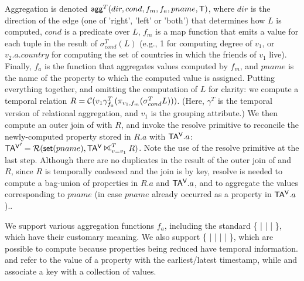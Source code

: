 Aggregation is denoted $\textsf{agg}^T(dir,cond,f_m,f_a,pname,\mathsf{T})$,
where $dir$ is the direction of the edge (one of 'right', 'left' or
'both') that determines how $L$ is computed, $cond$ is a predicate
over $L$, $f_m$ is a map function that emits a value for each tuple in
the result of $\sigma^T_{cond}(L)$ (e.g., 1 for computing degree of
$v_1$, or $v_2.a.country$ for computing the set of countries in which
the friends of $v_1$ live).  Finally, $f_a$ is the function that
aggregates values computed by $f_m$, and $pname$ is the name of the
property to which the computed value is assigned.  Putting everything
together, and omitting the computation of $L$ for clarity: we compute
a temporal relation $R = \mathcal{C}(v_1 \gamma^T_{f_a} (\pi_{v_1,f_m}
  (\sigma^T_{cond} L)))$. (Here, $\gamma^T$ is the temporal version of
relational aggregation, and $v_1$ is the grouping attribute.)  We then
compute an outer join of \tav with $R$, and invoke the resolve
primitive to reconcile the newly-computed property stored in $R.a$
with $\mathsf{TA^{V}}.a$: $\tav' = \resolve{\insql{set}(pname)}{\tav
  \rightouterjoin^T_{v=v_1} R}$. Note the use of the resolve primitive
at the last step.  Although there are no duplicates in the result of
the outer join of \tav and $R$, since $R$ is temporally coalesced and
the join is by key, resolve is needed to compute a bag-union of
properties in $R.a$ and $\mathsf{TA^{V}}.a$, and to aggregate the values
corresponding to $pname$ (in case $pname$ already occurred as a
property in $\mathsf{TA^{V}}.a$)..


We support various aggregation functions $f_a$, including the standard
\{  |  |  |  \}, which
have their customary meaning.  We also support \{  |
 |  |  |  \}, which
are possible to compute because properties being reduced have temporal
information.   and  refer to the value of a
property with the earliest/latest timestamp, while  and
 associate a key with a collection of values.

